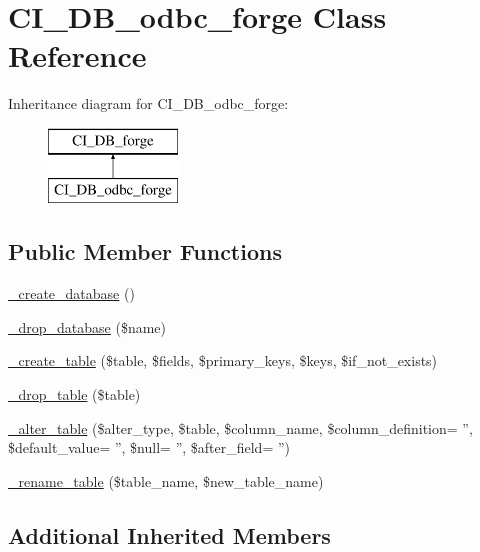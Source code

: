\hypertarget{class_c_i___d_b__odbc__forge}{\section{C\-I\-\_\-\-D\-B\-\_\-odbc\-\_\-forge Class Reference}
\label{class_c_i___d_b__odbc__forge}
}
Inheritance diagram for C\-I\-\_\-\-D\-B\-\_\-odbc\-\_\-forge\-:\begin{figure}[H]
\begin{center}
\leavevmode
\includegraphics[height=2.000000cm]{class_c_i___d_b__odbc__forge}
\end{center}
\end{figure}
\subsection*{Public Member Functions}
\begin{DoxyCompactItemize}
\item 
\hyperlink{class_c_i___d_b__odbc__forge_a04a053e8e211fd6213a56d990880ce96}{\-\_\-create\-\_\-database} ()
\item 
\hyperlink{class_c_i___d_b__odbc__forge_a6e04d0af5e8e1e1f93f42d63f0744bfd}{\-\_\-drop\-\_\-database} (\$name)
\item 
\hyperlink{class_c_i___d_b__odbc__forge_a99d4c17257f468337344690dd590582b}{\-\_\-create\-\_\-table} (\$table, \$fields, \$primary\-\_\-keys, \$keys, \$if\-\_\-not\-\_\-exists)
\item 
\hyperlink{class_c_i___d_b__odbc__forge_a147efb0d859b7cf4148ff75642515231}{\-\_\-drop\-\_\-table} (\$table)
\item 
\hyperlink{class_c_i___d_b__odbc__forge_a34fc29f48662e18f6a4f3185a8ea206c}{\-\_\-alter\-\_\-table} (\$alter\-\_\-type, \$table, \$column\-\_\-name, \$column\-\_\-definition= '', \$default\-\_\-value= '', \$null= '', \$after\-\_\-field= '')
\item 
\hyperlink{class_c_i___d_b__odbc__forge_aec593ba62c6ff875cafeac16b1c54ae6}{\-\_\-rename\-\_\-table} (\$table\-\_\-name, \$new\-\_\-table\-\_\-name)
\end{DoxyCompactItemize}
\subsection*{Additional Inherited Members}


